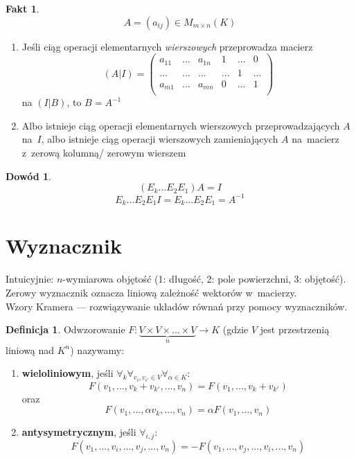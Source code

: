\documentclass[12pt,a4paper]{article}
\theoremstyle{plain}
\theoremstyle{definition}
\newtheorem{ft}{Fakt}[section]
\theoremstyle{definition}
\newtheorem{df}{Definicja}[section]
\theoremstyle{definition}
\theoremstyle{definition}
\newtheorem*{dd}{Dowód}
\theoremstyle{definition}
\theoremstyle{definition}
\theoremstyle{definition}
\theoremstyle{definition}
\theoremstyle{definition}
\begin{document}
\begin{ft}
    \[A = (a_{ij}) \in M_{m\times n}(K)\]
  \begin{enumerate}
    \item Jeśli ciąg operacji elementarnych \textit{wierszowych} przeprowadza
      macierz \[(A|I)=\begin{pmatrix}
        a_{11}&...&a_{1n}& 1 &...& 0 \\
        ...&...&...&...& 1 &...\\
        a_{m1}&...&a_{mn}& 0 &...& 1 \\
      \end{pmatrix}\]
      na $(I|B)$, to $B = A^{-1}$
    \item Albo istnieje ciąg operacji elementarnych wierszowych
      przeprowadzających $A$ na~$I$, albo istnieje ciąg operacji
      wierszowych zamieniających $A$ na~macierz z~zerową kolumną/
      zerowym wierszem
  \end{enumerate}
\end{ft}

\begin{dd}
    \[(E_k...E_2E_1)A=I\]
  \[E_k...E_2E_1I=E_k...E_2E_1=A^{-1}\]
\end{dd}

\section{Wyznacznik}
    Intuicyjnie: $n$-wymiarowa objętość (1: długość, 2: pole powierzchni, 3: objętość). \\
    Zerowy wyznacznik oznacza liniową zależność wektorów w~macierzy. \\
    Wzory Kramera --- rozwiązywanie układów równań przy pomocy wyznaczników.

\begin{df}
    Odwzorowanie
  $F: \underbrace{V \times V \times ... \times V}_{n} \rightarrow K$
  (gdzie $V$ jest przestrzenią liniową nad $K^n$) nazywamy:
  \begin{enumerate}
    \item \textbf{wieloliniowym}, jeśli
      $\forall_k\forall_{v_i,v_{i'}\in V}\forall_{\alpha\in K}$:
      \[F(v_1, ..., v_k+v_{k'}, ..., v_n)
      = F(v_1, ..., v_k+v_{k'})\]
      oraz
      \[F(v_1, ..., \alpha v_k, ..., v_n) = \alpha F(v_1, ..., v_n)\]
    \item \textbf{antysymetrycznym}, jeśli $\forall_{i,j}$:
      \[F(v_1, ..., v_i, ..., v_j, ..., v_n)
      = -F(v_1, ..., v_j, ..., v_i, ..., v_n)\]
  \end{enumerate}
\end{df}
\end{document}
